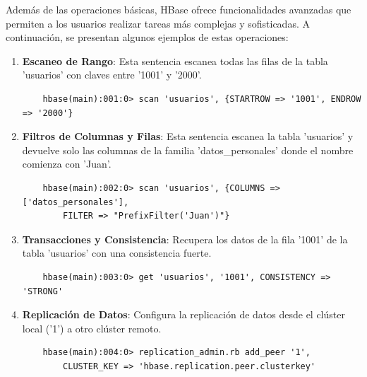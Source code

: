\documentclass[pdflatex,sn-mathphys-num]{sn-jnl}
\theoremstyle{thmstyleone}%
\theoremstyle{thmstyletwo}%
\theoremstyle{thmstylethree}%
\begin{document}
\vspace{-0.4cm}

Además de las operaciones básicas, HBase ofrece funcionalidades avanzadas que permiten a los usuarios realizar tareas más complejas y sofisticadas. A continuación, se presentan algunos ejemplos de estas operaciones:

\begin{enumerate}
    \item \textbf{Escaneo de Rango}: Esta sentencia escanea todas las filas de la tabla 'usuarios' con claves entre '1001' y '2000'.
    \begin{verbatim}
    hbase(main):001:0> scan 'usuarios', {STARTROW => '1001', ENDROW => '2000'}
    \end{verbatim}

    \vspace{-0.25cm}
    
    \item \textbf{Filtros de Columnas y Filas}: Esta sentencia escanea la tabla 'usuarios' y devuelve solo las columnas de la familia 'datos\_personales' donde el nombre comienza con 'Juan'.
    \begin{verbatim}
    hbase(main):002:0> scan 'usuarios', {COLUMNS => ['datos_personales'], 
        FILTER => "PrefixFilter('Juan')"}
    \end{verbatim}
    
    \vspace{-0.25cm}
    
    \item \textbf{Transacciones y Consistencia}: Recupera los datos de la fila '1001' de la tabla 'usuarios' con una consistencia fuerte.
    \begin{verbatim}
    hbase(main):003:0> get 'usuarios', '1001', CONSISTENCY => 'STRONG'
    \end{verbatim}

    \vspace{-0.25cm}
    
    \item \textbf{Replicación de Datos}: Configura la replicación de datos desde el clúster local ('1') a otro clúster remoto.
    \begin{verbatim}
    hbase(main):004:0> replication_admin.rb add_peer '1', 
        CLUSTER_KEY => 'hbase.replication.peer.clusterkey'
    \end{verbatim}

    \vspace{-0.25cm}
        

\end{enumerate}
\end{document}
